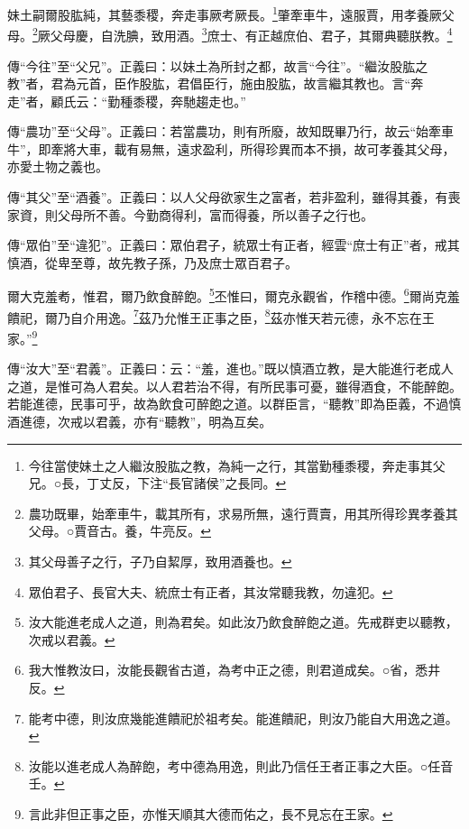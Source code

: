 妹土嗣爾股肱純，其藝黍稷，奔走事厥考厥長。\footnote{今往當使妹土之人繼汝股肱之教，為純一之行，其當勤種黍稷，奔走事其父兄。○長，丁丈反，下注“長官諸侯”之長同。}肇牽車牛，遠服賈，用孝養厥父母。\footnote{農功既畢，始牽車牛，載其所有，求易所無，遠行賈賣，用其所得珍異孝養其父母。○賈音古。養，牛亮反。}厥父母慶，自洗腆，致用酒。\footnote{其父母善子之行，子乃自絜厚，致用酒養也。}庶士、有正越庶伯、君子，其爾典聽朕教。\footnote{眾伯君子、長官大夫、統庶士有正者，其汝常聽我教，勿違犯。}


{\noindent\zhuan{}\fzbyks 傳“今往”至“父兄”。正義曰：以妹土為所封之都，故言“今往”。“繼汝股肱之教”者，君為元首，臣作股肱，君倡臣行，施由股肱，故言繼其教也。言“奔走”者，顧氏云：“勤種黍稷，奔馳趨走也。” \par}

{\noindent\zhuan{}\fzbyks 傳“農功”至“父母”。正義曰：若當農功，則有所廢，故知既畢乃行，故云“始牽車牛”，即牽將大車，載有易無，遠求盈利，所得珍異而本不損，故可孝養其父母，亦愛土物之義也。 \par}

{\noindent\zhuan{}\fzbyks 傳“其父”至“酒養”。正義曰：以人父母欲家生之富者，若非盈利，雖得其養，有喪家資，則父母所不善。今勤商得利，富而得養，所以善子之行也。 \par}

{\noindent\zhuan{}\fzbyks 傳“眾伯”至“違犯”。正義曰：眾伯君子，統眾士有正者，經雲“庶士有正”者，戒其慎酒，從卑至尊，故先教子孫，乃及庶士眾百君子。 \par}

爾大克羞耇，惟君，爾乃飲食醉飽。\footnote{汝大能進老成人之道，則為君矣。如此汝乃飲食醉飽之道。先戒群吏以聽教，次戒以君義。}丕惟曰，爾克永觀省，作稽中德。\footnote{我大惟教汝曰，汝能長觀省古道，為考中正之德，則君道成矣。○省，悉井反。}爾尚克羞饋祀，爾乃自介用逸。\footnote{能考中德，則汝庶幾能進饋祀於祖考矣。能進饋祀，則汝乃能自大用逸之道。}茲乃允惟王正事之臣，\footnote{汝能以進老成人為醉飽，考中德為用逸，則此乃信任王者正事之大臣。○任音壬。}茲亦惟天若元德，永不忘在王家。”\footnote{言此非但正事之臣，亦惟天順其大德而佑之，長不見忘在王家。}

{\noindent\zhuan{}\fzbyks 傳“汝大”至“君義”。正義曰：云：“羞，進也。”既以慎酒立教，是大能進行老成人之道，是惟可為人君矣。以人君若治不得，有所民事可憂，雖得酒食，不能醉飽。若能進德，民事可乎，故為飲食可醉飽之道。以群臣言，“聽教”即為臣義，不過慎酒進德，次戒以君義，亦有“聽教”，明為互矣。 \par}

